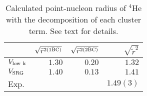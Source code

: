 \documentclass[aps,prc, dvips, twocolumn,groupedaddress,showkeys,showpacs,floatfix,superscriptaddress]{revtex4-1}
\newcommand{\<}{\langle}
\renewcommand{\>}{\rangle}
\begin{document}

\begin{table}[b!]
  \caption{\label{tab_vlowk_r}Calculated point-nucleon radius of ${}^4$He with the decomposition of each cluster term.
See text for details. }
 \begin{ruledtabular}
  \begin{tabular}{lrrr}
    &   $\sqrt{\widetilde{r}^{2({\rm 1BC})}}$ & $\sqrt{\widetilde{r}^{2({\rm 2BC})}}$ &  $\sqrt{\widetilde{r}^{2}}$  \\ \hline
    $V_{\rm low \ k}$ &  $1.30$ & $0.20$   & $1.32$ \\
    $V_{\rm SRG}$ &  $1.40$ & $0.13$ & $1.41$  \\
    Exp.\cite{Alkhazov:1997}   & & & $1.49(3)$ \\
  \end{tabular}
 \end{ruledtabular}
\end{table}
\end{document}
